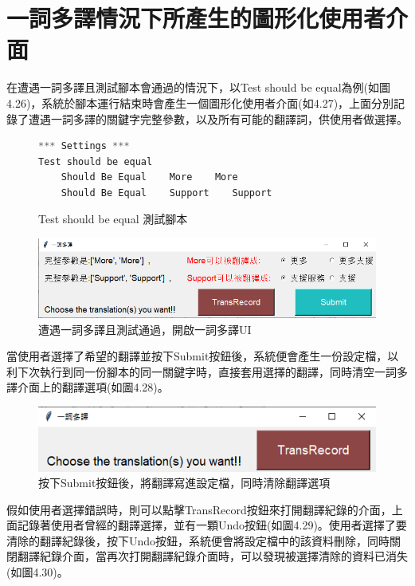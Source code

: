 \section{一詞多譯情況下所產生的圖形化使用者介面}
在遭遇一詞多譯且測試腳本會通過的情況下，以Test should be equal為例(如圖4.26)，系統於腳本運行結束時會產生一個圖形化使用者介面(如4.27)，上面分別記錄了遭遇一詞多譯的關鍵字完整參數，以及所有可能的翻譯詞，供使用者做選擇。\\

\begin{figure}[H]
\begin{lstlisting}[language={python}]
*** Settings ***
Test should be equal
    Should Be Equal    More    More
    Should Be Equal    Support    Support
\end{lstlisting}
\caption{Test should be equal 測試腳本}
\end{figure}

\begin{figure}[H]
\includegraphics[width= \textwidth]{../論文截圖/4-3-2 測試通過且有一詞多譯時，UI會跳出.png}
\caption{遭遇一詞多譯且測試通過，開啟一詞多譯UI}
\end{figure}

當使用者選擇了希望的翻譯並按下Submit按鈕後，系統便會產生一份設定檔，以利下次執行到同一份腳本的同一關鍵字時，直接套用選擇的翻譯，同時清空一詞多譯介面上的翻譯選項(如圖4.28)。

\begin{figure}[H]
\includegraphics[width= \textwidth]{../論文截圖/4-3-3 選擇翻譯後，清空選項.png}
\caption{按下Submit按鈕後，將翻譯寫進設定檔，同時清除翻譯選項}
\end{figure}

假如使用者選擇錯誤時，則可以點擊TransRecord按鈕來打開翻譯紀錄的介面，上面記錄著使用者曾經的翻譯選擇，並有一顆Undo按鈕(如圖4.29)。使用者選擇了要清除的翻譯紀錄後，按下Undo按鈕，系統便會將設定檔中的該資料刪除，同時關閉翻譯紀錄介面，當再次打開翻譯紀錄介面時，可以發現被選擇清除的資料已消失(如圖4.30)。

